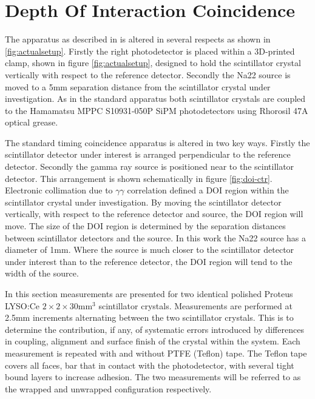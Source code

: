 \section{Depth Of Interaction Coincidence}
The apparatus as described in \cite{arron_Meyer_Pauwels_Lecoq_2012} is altered in several respects as shown in \ref{fig:actualsetup}. Firstly the right photodetector is placed within a 3D-printed clamp, shown in figure \ref{fig:actualsetup}, designed to hold the scintillator crystal vertically with respect to the reference detector. Secondly the Na22 source is moved to a 5mm separation distance from the scintillator crystal under investigation. As in the standard apparatus both scintillator crystals are coupled to the Hamamatsu MPPC S10931-050P SiPM photodetectors using Rhorosil 47A optical grease. 

The standard timing coincidence apparatus is altered in two key ways. Firstly the scintillator detector under interest is arranged perpendicular to the reference detector. Secondly the gamma ray source is positioned near to the scintillator detector. This arrangement is shown schematically in figure \ref{fig:doi-ctr}. Electronic collimation due to $\gamma\gamma$ correlation defined a DOI region within the scintillator crystal under investigation. By moving the scintillator detector vertically, with respect to the reference detector and source, the DOI region will move. The size of the DOI region is determined by the separation distances between scintillator detectors and the source. In this work the Na22 source has a diameter of 1mm. Where the source is much closer to the scintillator detector under interest than to the reference detector, the DOI region will tend to the width of the source.

In this section measurements are presented for two identical polished Proteus LYSO:Ce $2\times2\times30$mm$^3$ scintillator crystals. Measurements are performed at 2.5mm increments alternating between the two scintillator crystals. This is to determine the contribution, if any, of systematic errors introduced by differences in coupling, alignment and surface finish of the crystal within the system. Each measurement is repeated with and without PTFE (Teflon) tape. The Teflon tape covers all faces, bar that in contact with the photodetector, with several tight bound layers to increase adhesion. The two measurements will be referred to as the wrapped and unwrapped configuration respectively.
